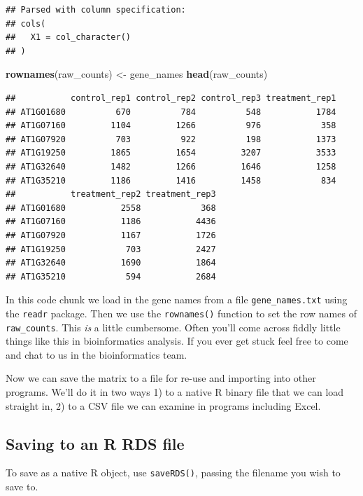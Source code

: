 \documentclass[]{book}
\newenvironment{Shaded}{\begin{snugshade}}{\end{snugshade}}
\newcommand{\KeywordTok}[1]{\textcolor[rgb]{0.13,0.29,0.53}{\textbf{#1}}}
\newcommand{\NormalTok}[1]{#1}
\newcommand{\StringTok}[1]{\textcolor[rgb]{0.31,0.60,0.02}{#1}}
\begin{document}
\begin{verbatim}
## Parsed with column specification:
## cols(
##   X1 = col_character()
## )
\end{verbatim}

\begin{Shaded}
\begin{Highlighting}[]
\KeywordTok{rownames}\NormalTok{(raw_counts) <-}\StringTok{ }\NormalTok{gene_names}
\KeywordTok{head}\NormalTok{(raw_counts)}
\end{Highlighting}
\end{Shaded}

\begin{verbatim}
##           control_rep1 control_rep2 control_rep3 treatment_rep1
## AT1G01680          670          784          548           1784
## AT1G07160         1104         1266          976            358
## AT1G07920          703          922          198           1373
## AT1G19250         1865         1654         3207           3533
## AT1G32640         1482         1266         1646           1258
## AT1G35210         1186         1416         1458            834
##           treatment_rep2 treatment_rep3
## AT1G01680           2558            368
## AT1G07160           1186           4436
## AT1G07920           1167           1726
## AT1G19250            703           2427
## AT1G32640           1690           1864
## AT1G35210            594           2684
\end{verbatim}

In this code chunk we load in the gene names from a file \texttt{gene\_names.txt} using the \texttt{readr} package. Then we use the \texttt{rownames()} function to set the row names of \texttt{raw\_counts}. This \emph{is} a little cumbersome. Often you'll come across fiddly little things like this in bioinformatics analysis. If you ever get stuck feel free to come and chat to us in the bioinformatics team.

Now we can save the matrix to a file for re-use and importing into other programs. We'll do it in two ways 1) to a native R binary file that we can load straight in, 2) to a CSV file we can examine in programs including Excel.

\hypertarget{saving-to-an-r-rds-file}{%
\subsection{Saving to an R RDS file}\label{saving-to-an-r-rds-file}}

To save as a native R object, use \texttt{saveRDS()}, passing the filename you wish to save to.
\end{document}
